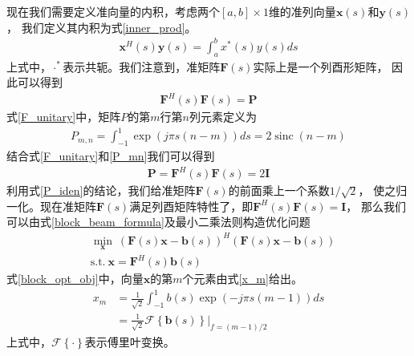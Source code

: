\documentclass[master]{thesis-uestc}
\begin{document}
现在我们需要定义准向量的内积，考虑两个$[a,b] \times 1$维的准列向量$\bm{x}(s)$和$\bm{y}(s)$，
我们定义其内积为式\eqref{inner_prod}。
\begin{equation}\label{inner_prod}
    \begin{aligned}
        \bm{x}^H(s)\bm{y}(s) = \int_{a}^{b}x^*(s)y(s)ds
    \end{aligned}
\end{equation}
上式中，$\cdot^*$表示共轭。我们注意到，准矩阵$\bm{F}(s)$实际上是一个列酉形矩阵，
因此可以得到
\begin{equation}\label{F_unitary}
    \begin{aligned}
        \bm{F}^H(s)\bm{F}(s) = \bm{P}
    \end{aligned}
\end{equation}
式\eqref{F_unitary}中，矩阵$P$的第$m$行第$n$列元素定义为
\begin{equation}\label{P_mn}
    \begin{aligned}
        P_{m,n} = \int_{-1}^{1}\exp\left(j\pi s(n-m)\right)ds = 2\operatorname{sinc}(n-m)
    \end{aligned}
\end{equation}
结合式\eqref{F_unitary}和\eqref{P_mn}我们可以得到
\begin{equation}\label{P_iden}
    \begin{aligned}
        \bm{P} = \bm{F}^H(s)\bm{F}(s) = 2\bm{I}
    \end{aligned}
\end{equation}
利用式\eqref{P_iden}的结论，我们给准矩阵$\bm{F}(s)$的前面乘上一个系数$1/\sqrt{2}$，
使之归一化。现在准矩阵$\bm{F}(s)$满足列酉矩阵特性了，即$\bm{F}^H(s)\bm{F}(s) = \bm{I}$，
那么我们可以由式\eqref{block_beam_formula}及最小二乘法则构造优化问题
\begin{equation}\label{block_opt_obj}
    \begin{aligned}
        &\min_\bm{x} ~ \left(\bm{F}(s)\bm{x}-\bm{b}(s)\right)^H\left(\bm{F}(s)\bm{x}-\bm{b}(s)\right)
        \\
        &\text{s.t.} ~ \bm{x} = \bm{F}^H(s)\bm{b}(s)
    \end{aligned}
\end{equation}
式\eqref{block_opt_obj}中，向量$\bm{x}$的第$m$个元素由式\eqref{x_m}给出。
\begin{equation}\label{x_m}
    \begin{aligned}
        x_m &= \frac{1}{\sqrt{2}}\int_{-1}^{1}b(s)\exp\left(-j\pi s (m-1)\right)ds
        \\
            &= \frac{1}{\sqrt{2}}\mathcal{F}\left\{\bm{b}(s)\right\}|_{f=(m-1)/2}
    \end{aligned}
\end{equation}
上式中，$\mathcal{F}\left\{\cdot\right\}$表示傅里叶变换。
\end{document}
